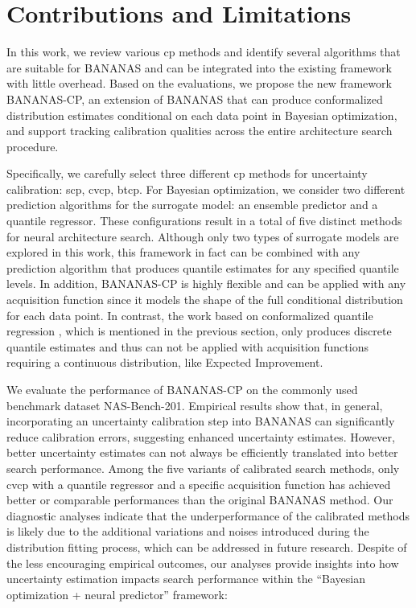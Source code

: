 \documentclass[a4paper,oneside,bibliography=totoc]{scrbook}
\begin{document}
\section{Contributions and Limitations}
In this work, we review various \gls{cp} methods and identify several algorithms that are suitable for BANANAS and can be integrated into the existing framework with little overhead. Based on the evaluations, we propose the new framework BANANAS-CP, an extension of BANANAS that can produce conformalized distribution estimates conditional on each data point in Bayesian optimization, and support tracking calibration qualities across the entire architecture search procedure. 

Specifically, we carefully select three different \gls{cp} methods for uncertainty calibration: \gls{scp}, \gls{cvcp}, \gls{btcp}. For Bayesian optimization, we consider two different prediction algorithms for the surrogate model: an ensemble predictor and a quantile regressor. These configurations result in a total of five distinct methods for neural architecture search. Although only two types of surrogate models are explored in this work, this framework in fact can be combined with any prediction algorithm that produces quantile estimates for any specified quantile levels. In addition, BANANAS-CP is highly flexible and can be applied with any acquisition function since it models the shape of the full conditional distribution for each data point. In contrast, the work based on conformalized quantile regression \cite{salinas2023optimizing}, which is mentioned in the previous section, only produces discrete quantile estimates and thus can not be applied with acquisition functions requiring a continuous distribution, like Expected Improvement.

We evaluate the performance of BANANAS-CP on the commonly used benchmark dataset NAS-Bench-201. Empirical results show that, in general, incorporating an uncertainty calibration step into BANANAS can significantly reduce calibration errors, suggesting enhanced uncertainty estimates. However, better uncertainty estimates can not always be efficiently translated into better search performance. Among the five variants of calibrated search methods, only \gls{cvcp} with a quantile regressor and a specific acquisition function has achieved better or comparable performances than the original BANANAS method. Our diagnostic analyses indicate that the underperformance of the calibrated methods is likely due to the additional variations and noises introduced during the distribution fitting process, which can be addressed in future research. Despite of the  less encouraging empirical outcomes, our analyses provide insights into how uncertainty estimation impacts search performance within the  “Bayesian optimization + neural predictor” framework:
\end{document}
